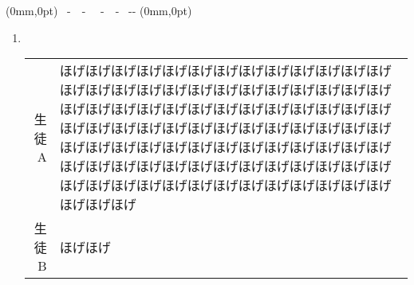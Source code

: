 \documentclass[b5j,10pt,dvipdfmx]{jsbook}
\begin{document}
\setcounter{page}{0}
%
{(0mm,0pt)%
{~\hfill -~\thepage ~- \hfill~}{~\hfill -~\thepage~- \hfill~}{\hfill-\pagemark -\hfill}%
(0mm,0pt)}

\pagestyle{empty}
\begin{enumerate}
\item ~~\\
      \begin{screen}
            \begin{tabularx}{\linewidth}{rX}
                  生徒A & ほげほげほげほげほげほげほげほげほげほげほげほげほげほげほげほげほげほげほげほげほげほげほげほげほげほげほげほげほげほげほげほげほげほげほげほげほげほげほげほげほげほげほげほげほげほげほげほげほげほげほげほげほげほげほげほげほげほげほげほげほげほげほげほげほげほげほげほげほげほげほげほげほげほげほげほげほげほげほげほげほげほげほげほげほげほげほげほげほげほげほげほげほげほげ \\
                  生徒B & ほげほげ \\
            \end{tabularx}
      \end{screen}
% 
%
%
%
\end{enumerate}
\end{document}
